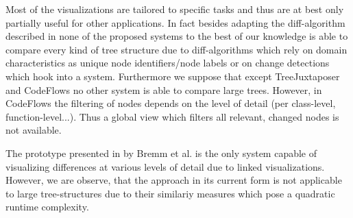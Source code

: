 Most of the visualizations are tailored to specific tasks and thus are at best only partially useful for other applications. In fact besides adapting the diff-algorithm described in \cite{telea2008code} none of the proposed systems to the best of our knowledge is able to compare every kind of tree structure due to diff-algorithms which rely on domain characteristics as unique node identifiers/node labels or on change detections which hook into a system. Furthermore we suppose that except TreeJuxtaposer and CodeFlows no other system is able to compare large trees. However, in CodeFlows the filtering of nodes depends on the level of detail (per class-level, function-level...). Thus a global view which filters all relevant, changed nodes is not available.

The prototype presented in \cite{bremm2011interactive} by Bremm et al. is the only system capable of visualizing differences at various levels of detail due to linked visualizations. However, we are observe, that the approach in its current form is not applicable to large tree-structures due to their similariy measures which pose a quadratic runtime complexity.














